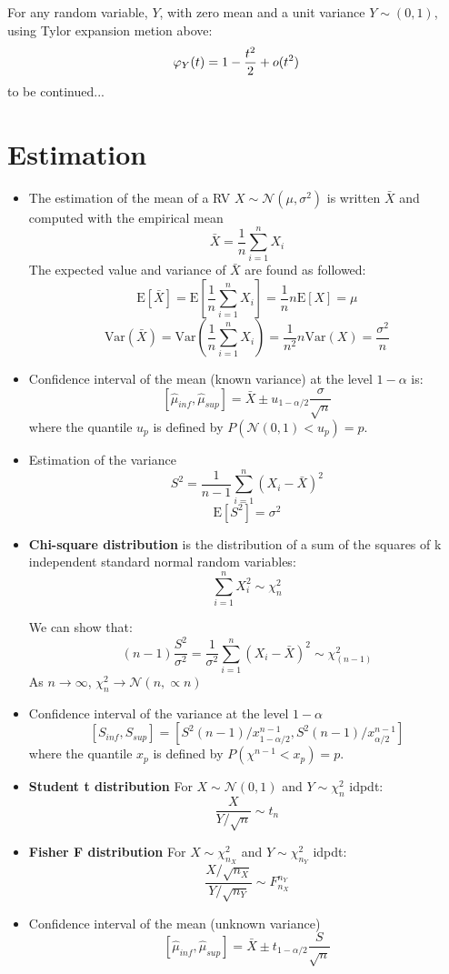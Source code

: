 \documentclass[twocolumn]{article}
\numberwithin{equation}{section}
\begin{document}
For any random variable, $Y$, with zero mean and a unit variance $Y \sim (0,1)$, using Tylor expansion metion above:
$$\varphi_Y(t) = 1 - {t^2 \over 2} + o(t^2)$$
to be continued...

\section{Estimation}

\begin{itemize}
	\item The estimation of the mean of a RV $X\sim \mathcal{N}(\mu,\sigma^2)$ is written $\bar{X}$ and computed with the empirical mean
$$ \bar{X} = \frac{1}{n} \sum_{i=1}^n X_i $$
The expected value and variance of $\bar{X}$ are found as followed:
$$ \text{E}[\bar{X}] = \text{E}\left[ \frac{1}{n} \sum_{i=1}^n X_i \right] =  \frac{1}{n} n \text{E}[X] =\mu $$
$$\text{Var}(\bar{X}) = \text{Var}\left( \frac{1}{n} \sum_{i=1}^n X_i \right) = \frac{1}{n^2} n \text{Var}(X) = \frac{\sigma^2}{n} $$

	\item Confidence interval of the mean (known variance) at the level $1-\alpha$ is:
$$ [\hat{\mu}_{inf}, \hat{\mu}_{sup}] = \bar{X} \pm u_{1-\alpha/2}\frac{\sigma}{\sqrt{n}} $$
where the quantile $u_p$ is defined by $P(\mathcal{N}(0, 1) < u_p) = p$.
	\item Estimation of the variance
$$ S^2 = \frac{1}{n-1} \sum_{i=1}^n (X_i-\bar{X})^2 $$
$$ \text{E}[S^2] = \sigma^2 $$

	\item \textbf{Chi-square distribution} is the distribution of a sum of the squares of k independent standard normal random variables:
$$ \sum_{i=1}^n X_i^2 \sim  \chi^2_n$$
  
We can show that:
$$ (n-1)\frac{S^2}{\sigma^2} = \frac{1}{\sigma^2}\sum_{i=1}^n (X_i-\bar{X})^2\sim \chi_{(n-1)}^2 $$
As $n \rightarrow \infty$, $\chi_{n}^2 \rightarrow \mathcal{N}(n,\propto n)$

	\item Confidence interval of the variance at the level $1-\alpha$
$$ [S_{inf}, S_{sup}] = [S^2(n-1)/x_{1-\alpha/2}^{n-1}, S^2(n-1)/x_{\alpha/2}^{n-1}] $$
where the quantile $x_p$ is defined by $P(\chi^{n-1} < x_p) = p$.
	\item \textbf{Student t distribution}
For $X \sim \mathcal{N}(0,1)$ and $Y \sim \chi_n^2$ idpdt:
$$ \frac{X}{Y / \sqrt{n}} \sim t_n $$

	\item \textbf{Fisher F distribution}
	For $X \sim \chi_{n_X}^2$ and $Y \sim \chi_{n_Y}^2$ idpdt:
$$ \frac{X / \sqrt{n_X}}{Y / \sqrt{n_Y}} \sim F_{n_X}^{n_Y} $$

	\item Confidence interval of the mean (unknown variance)
$$ [\hat{\mu}_{inf}, \hat{\mu}_{sup}] = \bar{X} \pm t_{1-\alpha/2}\frac{S}{\sqrt{n}} $$

\end{itemize}
\end{document}
